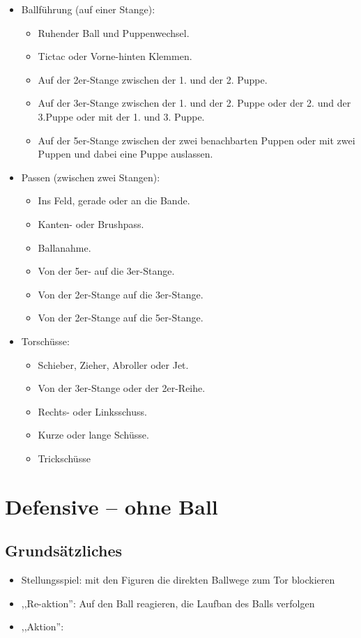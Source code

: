 \begin{itemize}
\item Ballführung (auf einer Stange): 
\begin{itemize}
\item Ruhender Ball und Puppenwechsel.
\item Tictac oder Vorne-hinten Klemmen.
\item Auf der 2er-Stange zwischen der 1. und der 2. Puppe.
\item Auf der 3er-Stange zwischen der 1. und der 2. Puppe oder der 2. und der 3.Puppe oder mit der 1. und 3. Puppe.
\item Auf der 5er-Stange zwischen der zwei benachbarten Puppen oder mit zwei Puppen und dabei eine Puppe auslassen.
\end{itemize}
\item Passen (zwischen zwei Stangen):
\begin{itemize}
\item Ins Feld, gerade oder an die Bande.
\item Kanten- oder Brushpass.
\item Ballanahme.
\item Von der 5er- auf die 3er-Stange.
\item Von der 2er-Stange auf die 3er-Stange.
\item Von der 2er-Stange auf die 5er-Stange.
\end{itemize}
\item Torschüsse: 
\begin{itemize}
\item Schieber, Zieher, Abroller oder Jet.
\item Von der 3er-Stange oder der 2er-Reihe.
\item Rechts- oder Linksschuss.
\item Kurze oder lange Schüsse.
\item Trickschüsse
\end{itemize}
\end{itemize}

\section{Defensive -- ohne Ball}
\label{technik:defensive}

\subsection{Grundsätzliches} 
\begin{itemize}
\item Stellungsspiel: mit den Figuren die direkten Ballwege zum Tor blockieren 
\item ,,Re-aktion'': Auf den Ball reagieren,  die Laufban des Balls verfolgen 
\item ,,Aktion'':  
\end{itemize}


